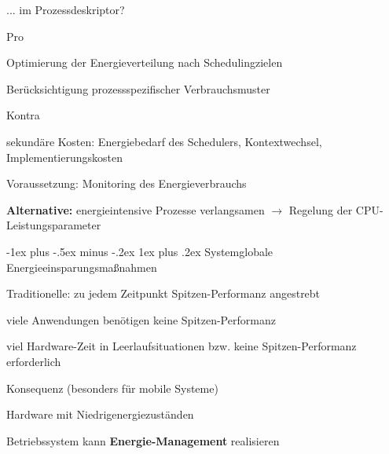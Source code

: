 \documentclass[a4paper]{article}
\makeatletter
\renewcommand{\subsubsection}{\@startsection{subsubsection}{3}{0mm}%
 {-1ex plus -.5ex minus -.2ex}%
 {1ex plus .2ex}%
 {\normalfont\small\bfseries}}
\makeatother
\begin{document}
\begin{multicols}{3}
\begin{itemize*}
\begin{itemize*}
            \item ... im Prozessdeskriptor?
        \end{itemize*}
        \item Pro
        \begin{itemize*}
            \item Optimierung der Energieverteilung nach Schedulingzielen
            \item Berücksichtigung prozessspezifischer Verbrauchsmuster
        \end{itemize*}
        \item Kontra
        \begin{itemize*}
            \item sekundäre Kosten: Energiebedarf des Schedulers, Kontextwechsel, Implementierungskosten
            \item Voraussetzung: Monitoring des Energieverbrauchs
        \end{itemize*}
        \item \textbf{Alternative:} energieintensive Prozesse verlangsamen $\rightarrow$ Regelung der CPU-Leistungsparameter
    \end{itemize*}

    \subsubsection{Systemglobale Energieeinsparungsmaßnahmen}
    \begin{itemize*}
        \item Traditionelle: zu jedem Zeitpunkt Spitzen-Performanz angestrebt
        \begin{itemize*}
            \item viele Anwendungen benötigen keine Spitzen-Performanz
            \item viel Hardware-Zeit in Leerlaufsituationen bzw. keine Spitzen-Performanz erforderlich
        \end{itemize*}
        \item Konsequenz (besonders für mobile Systeme)
        \begin{itemize*}
            \item Hardware mit Niedrigenergiezuständen
            \item Betriebssystem kann \textbf{Energie-Management} realisieren
        \end{itemize*}
    \end{itemize*}


\end{multicols}
\end{document}
